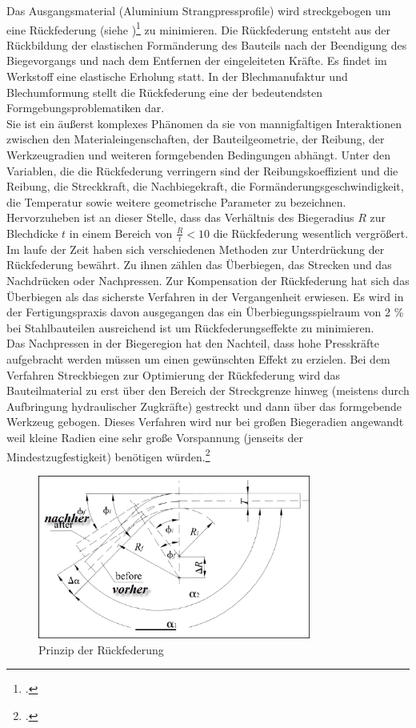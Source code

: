 \documentclass[12pt,a4paper,parskip]{scrartcl}
\begin{document}
Das Ausgangsmaterial (Aluminium Strangpressprofile) wird streckgebogen um eine Rückfederung (siehe )\footcite[Vgl.][65]{smfpd} zu minimieren.  Die Rückfederung entsteht aus der Rückbildung der elastischen Formänderung des Bauteils nach der Beendigung des Biegevorgangs und nach dem Entfernen der eingeleiteten Kräfte. Es findet im Werkstoff eine elastische Erholung statt. In der Blechmanufaktur und Blechumformung stellt die Rückfederung eine der bedeutendsten Formgebungsproblematiken dar.
\\
 Sie ist ein äußerst komplexes Phänomen da sie von mannigfaltigen Interaktionen zwischen den Materialeingenschaften, der Bauteilgeometrie, der Reibung,  der Werkzeugradien und weiteren formgebenden Bedingungen abhängt. Unter den Variablen, die die Rückfederung verringern sind der Reibungskoeffizient und die Reibung, die Streckkraft, die Nachbiegekraft, die Formänderungsgeschwindigkeit, die Temperatur sowie weitere geometrische Parameter zu bezeichnen. Hervorzuheben ist an dieser Stelle, dass das Verhältnis des Biegeradius $ R $ zur Blechdicke $ t $ in einem Bereich von $ \frac{R}{t} < 10 $ die Rückfederung wesentlich vergrößert. Im laufe der Zeit haben sich verschiedenen Methoden zur Unterdrückung der Rückfederung bewährt. Zu ihnen zählen das Überbiegen, das Strecken und das Nachdrücken oder Nachpressen. Zur Kompensation der Rückfederung hat sich das Überbiegen als das sicherste Verfahren in der Vergangenheit erwiesen. Es wird in der Fertigungspraxis davon ausgegangen das ein Überbiegungsspielraum von 2 \%  bei Stahlbauteilen ausreichend ist um Rückfederungseffekte zu minimieren.\\ Das Nachpressen in der Biegeregion hat den Nachteil, dass hohe Presskräfte aufgebracht werden müssen um einen gewünschten Effekt zu erzielen. Bei dem Verfahren  Streckbiegen zur Optimierung der Rückfederung wird das Bauteilmaterial zu erst über den Bereich der Streckgrenze hinweg (meistens durch Aufbringung hydraulischer Zugkräfte) gestreckt und dann über das formgebende Werkzeug gebogen. Dieses Verfahren wird nur bei großen Biegeradien angewandt weil kleine Radien eine sehr große Vorspannung (jenseits der Mindestzugfestigkeit) benötigen würden.\footcite[Vgl.][16-19]{hmp}\\  
 
 \begin{figure}[hbtp]
 \centering
 \includegraphics[width=0.8\textwidth]{springback}
 \caption{Prinzip der Rückfederung}
 \label{fig:springback}
 \end{figure}
 
\end{document}
